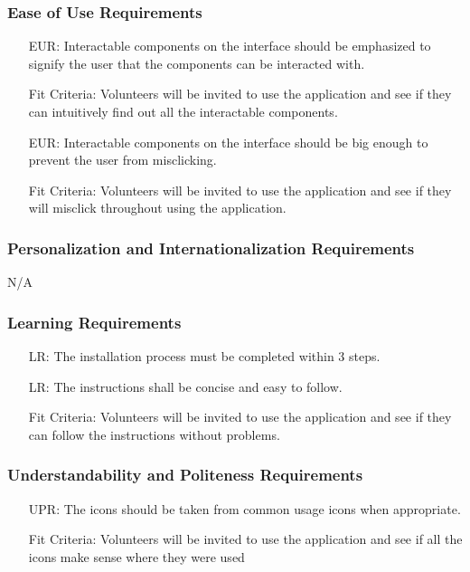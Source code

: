 \documentclass[12pt]{article}
\newcounter{reqnum} %
\newcounter{eurreqnum} %
\newcounter{lrreqnum} %
\newcounter{uprreqnum} %
\begin{document}
\subsubsection{Ease of Use Requirements}
\begin{itemize}
    \item[EUR\refstepcounter{eurreqnum}\theeurreqnum \label{R_Inputs}:] Interactable components on the interface should be emphasized to signify the user that the components can be interacted with.
    \item[] Fit Criteria: Volunteers will be invited to use the application and see if they can intuitively find out all the interactable components.
    \item[EUR\refstepcounter{eurreqnum}\theeurreqnum \label{R_Inputs}:] Interactable components on the interface should be big enough to prevent the user from misclicking.
    \item[] Fit Criteria: Volunteers will be invited to use the application and see if they will misclick throughout using the application.
\end{itemize}

\subsubsection{Personalization and Internationalization Requirements}
N/A

\subsubsection{Learning Requirements}
\begin{itemize}
    \item[LR\refstepcounter{lrreqnum}\thelrreqnum \label{R_Inputs}:] The installation process must be completed within 3 steps.
    \item[LR\refstepcounter{lrreqnum}\thelrreqnum \label{R_Inputs}:] The instructions shall be concise and easy to follow.
    \item[] Fit Criteria: Volunteers will be invited to use the application and see if they can follow the instructions without problems.
\end{itemize}

\subsubsection{Understandability and Politeness Requirements}
\begin{itemize}
    \item[UPR\refstepcounter{uprreqnum}\theuprreqnum \label{R_Inputs}:] The icons should be taken from common usage icons when appropriate.
    \item[] Fit Criteria: Volunteers will be invited to use the application and see if all the icons make sense where they were used
\end{itemize}
\end{document}
